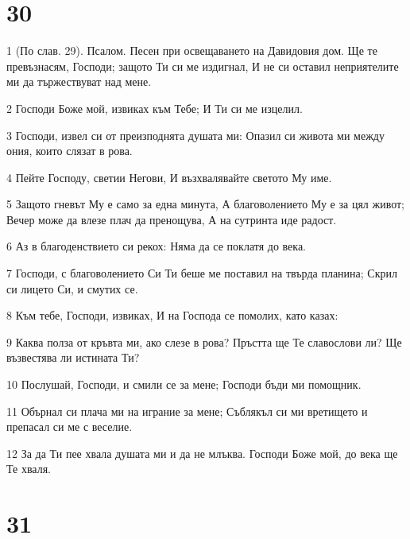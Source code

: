 \chapter{30}

\par 1 (По слав. 29). Псалом. Песен при освещаването на Давидовия дом. Ще те превъзнасям, Господи; защото Ти си ме издигнал, И не си оставил неприятелите ми да тържествуват над мене.
\par 2 Господи Боже мой, извиках към Тебе; И Ти си ме изцелил.
\par 3 Господи, извел си от преизподнята душата ми: Опазил си живота ми между ония, които слязат в рова.
\par 4 Пейте Господу, светии Негови, И възхвалявайте светото Му име.
\par 5 Защото гневът Му е само за една минута, А благоволението Му е за цял живот; Вечер може да влезе плач да пренощува, А на сутринта иде радост.
\par 6 Аз в благоденствието си рекох: Няма да се поклатя до века.
\par 7 Господи, с благоволението Си Ти беше ме поставил на твърда планина; Скрил си лицето Си, и смутих се.
\par 8 Към тебе, Господи, извиках, И на Господа се помолих, като казах:
\par 9 Каква полза от кръвта ми, ако слезе в рова? Пръстта ще Те славослови ли? Ще възвестява ли истината Ти?
\par 10 Послушай, Господи, и смили се за мене; Господи бъди ми помощник.
\par 11 Обърнал си плача ми на играние за мене; Съблякъл си ми вретището и препасал си ме с веселие.
\par 12 За да Ти пее хвала душата ми и да не млъква. Господи Боже мой, до века ще Те хваля.

\chapter{31}

